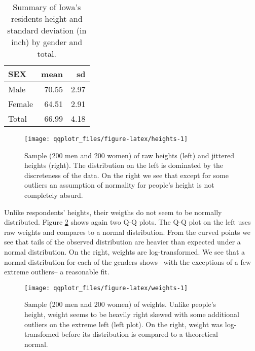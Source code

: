 \begin{table}

\caption{\label{tab:heights-table}Summary of Iowa's residents height and standard deviation (in inch) by gender and total.\label{tab:heights}}
\centering
\begin{tabular}[t]{lrr}
\toprule
SEX & mean & sd\\
\midrule
Male & 70.55 & 2.97\\
Female & 64.51 & 2.91\\
Total & 66.99 & 4.18\\
\bottomrule
\end{tabular}
\end{table}

\begin{Schunk}
\begin{figure}

{\centering \texttt{[image: qqplotr\_files/figure-latex/heights-1]} 

}

\caption[Sample (200 men and 200 women) of raw heights (left) and jittered heights (right)]{Sample (200 men and 200 women) of raw heights (left) and jittered heights (right). The distribution on the left is dominated by the discreteness of the data. On the right we see that except for some outliers an assumption of normality for people's height is not completely absurd.}\label{fig:heights}
\end{figure}
\end{Schunk}

Unlike respondents' heights, their weigths do not seem to be normally
distributed. Figure \ref{fig:weights} shows again two Q-Q plots. The Q-Q
plot on the left uses raw weights and compares to a normal distribution.
From the curved points we see that tails of the observed distribution
are heavier than expected under a normal distribution. On the right,
weights are log-transformed. We see that a normal distribution for each
of the genders shows --with the exceptions of a few extreme outliers-- a
reasonable fit.

\begin{Schunk}
\begin{figure}

{\centering \texttt{[image: qqplotr\_files/figure-latex/weights-1]} 

}

\caption[Sample (200 men and 200 women) of weights]{Sample (200 men and 200 women) of weights. Unlike people's height, weight seems to be heavily right skewed with some additional outliers on the extreme left (left plot). On the right, weight was log-transfomed before its distribution is compared to a theoretical normal. }\label{fig:weights}
\end{figure}
\end{Schunk}

